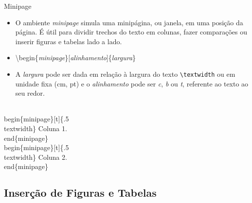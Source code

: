 \begin{frame}[fragile]{Minipage}
    \begin{itemize}
    \item O ambiente \textit{minipage} simula uma minipágina, ou janela, em uma posição da página. É útil para dividir trechos do texto em colunas, fazer comparações ou inserir figuras e tabelas lado a lado.
    \item[] \alert{\textbackslash begin\{\textit{minipage}\}[\textit{alinhamento}]\{\textit{largura}\}}
    \item A \textit{largura} pode ser dada em relação à largura do texto \verb|\textwidth| ou em unidade fixa (cm, pt) e o \textit{alinhamento} pode ser \textit{c}, \textit{b} ou \textit{t}, referente ao texto ao seu redor.
    \end{itemize}

    \begin{example}
\begin{semiverbatim}\footnotesize
    \\begin\{minipage\}[t]\{.5\\textwidth\}
        Coluna 1.
    \\end\{minipage\}
    \\begin\{minipage\}[t]\{.5\\textwidth\}
        Coluna 2.
    \\end\{minipage\}
\end{semiverbatim}
    \end{example}
\end{frame}

\subsection{Inserção de Figuras e Tabelas}

